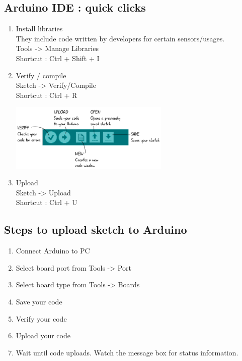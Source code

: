 \subsection{Arduino IDE : quick clicks}
\begin{enumerate}
    \item Install libraries\\
    They include code written by developers for certain sensors/usages.\\
    Tools -> Manage Libraries\\
    Shortcut : Ctrl + Shift + I
    
    \item Verify / compile\\
    Sketch -> Verify/Compile\\
    Shortcut : Ctrl + R
    
    \begin{marginfigure}
        \hspace{-4cm}\includegraphics[width=3in]{Images/Programing_Arduino/quick_tool.png}
    \end{marginfigure}
    
    \item Upload\\
    Sketch -> Upload\\
    Shortcut : Ctrl + U
\end{enumerate}

\subsection{Steps to upload sketch to Arduino}
\begin{enumerate}
    \item Connect Arduino to PC
    \item Select board port from Tools -> Port
    \item Select board type from Tools -> Boards
    \item Save your code 
    \item Verify your code
    \item Upload your code
    \item Wait until code uploads. Watch the message box for status information.
\end{enumerate}

